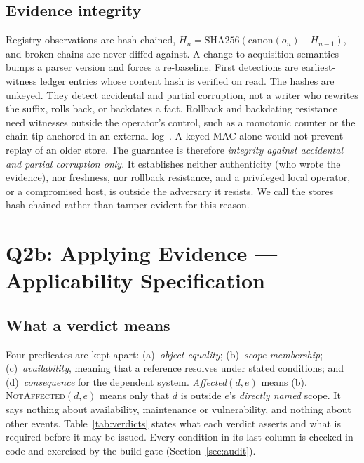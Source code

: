 \documentclass[11pt,a4paper]{article}
\begin{document}
\subsection{Evidence integrity}
\label{sec:integrity}
Registry observations are hash-chained,
$H_n = \mathrm{SHA256}(\mathrm{canon}(o_n) \| H_{n-1})$, and broken
chains are never diffed against. A change to acquisition semantics
bumps a parser version and forces a re-baseline. First detections are
earliest-witness ledger entries whose content hash is verified on
read. The hashes are unkeyed. They detect accidental and partial
corruption, not a writer who rewrites the suffix, rolls back, or
backdates a fact. Rollback and backdating resistance need witnesses
outside the operator's control, such as a monotonic counter or the
chain tip anchored in an external log~\cite{rfc9162}. A keyed MAC
alone would not prevent replay of an older store. The guarantee is
therefore \emph{integrity against accidental and partial corruption
only}. It establishes neither authenticity (who wrote the evidence),
nor freshness, nor rollback resistance, and a privileged local
operator, or a compromised host, is outside the adversary it resists.
We call the stores hash-chained rather than tamper-evident for this
reason.

\section{Q2b: Applying Evidence --- Applicability Specification}
\label{sec:applicability}

\subsection{What a verdict means}
\label{sec:meaning}
Four predicates are kept apart: (a)~\emph{object equality};
(b)~\emph{scope membership}; (c)~\emph{availability}, meaning that a
reference resolves under stated conditions; and (d)~\emph{consequence}
for the dependent system. \emph{Affected}$(d,e)$ means (b).
\textsc{NotAffected}$(d,e)$ means only that $d$ is outside $e$'s
\emph{directly named} scope. It says nothing about availability,
maintenance or vulnerability, and nothing about other events.
Table~\ref{tab:verdicts} states what each verdict asserts and what is
required before it may be issued. Every condition in its last column
is checked in code and exercised by the build gate
(Section~\ref{sec:audit}).
\end{document}
